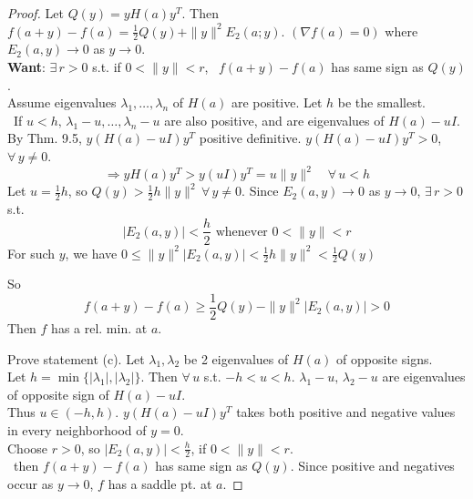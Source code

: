 \documentclass[twoside]{amsart}
\theoremstyle{plain}
\theoremstyle{definition}
\begin{document}
\begin{proof}
Let $Q(y) = y H(a) y^T$.  Then $f(a+y) -f(a) = \frac{1}{2} Q(y) + \| y\|^2 E_2(a;y)$.  $(\nabla f(a) =0)$ where $E_2(a,y) \to 0$ as $y\to 0$.   \\

\textbf{Want}: $\exists \, r >0$ s.t. if $0 < \| y \| < r$, \, $f(a+y) -f(a)$ has same sign as $Q(y)$.   \smallskip \\
Assume eigenvalues $\lambda_1, \dots, \lambda_n$ of $H(a)$ are positive.  Let $h$ be the smallest.  \\
\quad \, If $u < h, \, \lambda_1 - u, \dots, \lambda_n - u$ are also positive, and are eigenvalues of $H(a) - uI$.  \\
By Thm. 9.5, $y (H(a) - uI)y^T$ positive definitive.  $y(H(a) - uI)y^T >0$, $\forall \, y \neq 0$.  
\[
\Longrightarrow y H(a) y^T > y (uI) y^T = u \| y\|^2 \quad \forall \, u < h
\]
Let $u=\frac{1}{2} h$, so $Q(y) > \frac{1}{2} h \| y\|^2 \, \forall \, y \neq 0$.  Since $E_2(a,y) \to 0$ as $y\to 0$, $\exists \, r >0$ s.t. 
\[
| E_2(a,y)| < \frac{h}{2} \text{ whenever } 0 < \| y \| < r
\]
For such $y$, we have $0\leq \| y\|^2 |E_2(a,y) | < \frac{1}{2} h \| y\|^2 < \frac{1}{2} Q(y)$

So 
\[
f(a+y) - f(a) \geq \frac{1}{2} Q(y) - \| y\|^2 | E_2(a,y) | >0
\]
Then $f$  has a rel. min. at $a$.  

Prove statement (c).  Let $\lambda_1, \lambda_2$ be 2 eigenvalues of $H(a)$ of opposite signs.  \\
Let $h= \min{ \{ |\lambda_1|, |\lambda_2| \} }$.  Then $\forall \, u$ s.t. $-h < u <h$.  $\lambda_1 - u , \, \lambda_2 -u$ are eigenvalues of opposite sign of $H(a) - uI$.   \smallskip \\
Thus $u \in (-h,h)$.  $y (H(a)-uI)y^T$ takes both positive and negative values in every neighborhood of $y=0$.  \\
\quad Choose $r>0$, so $|E_2(a,y)| < \frac{h}{2}$, if $0<\| y \| < r$.  \\
\quad \, then $f(a+y) -f(a)$ has same sign as $Q(y)$.  
\quad \quad Since positive and negatives occur as $y\to 0$, $f$ has a saddle pt. at $a$.  

\end{proof}
\end{document}
